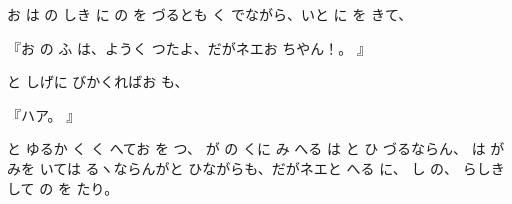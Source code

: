 
お
は
の
しき
に
の
を
づるとも
く
でながら、いと
に
を
きて、

『お
の
ふ
は、ようく
つたよ、だがネエお
ちやん！。
』

と
しげに
びかくればお
も、

『ハア。
』

と
ゆるか
く
く
へてお
を
つ、
が
の
くに
み
へる
は
と
ひ
づるならん、
は
が
みを
いては
るヽならんがと
ひながらも、だがネエと
へる
に、
し
の、
らしき
して
の
を
たり。

